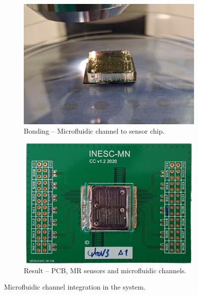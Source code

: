 \begin{figure}[!ht]
    \centering
    \begin{subfigure}[b]{.475\linewidth}
        \centering
        \includegraphics[width=\linewidth]{images/appendix_b/bonding.png}
        \caption{Bonding -- Microfluidic channel to sensor chip.}
        \label{figure:mf-bonding}
    \end{subfigure}
    \hfill
    \centering
    \begin{subfigure}[b]{.475\linewidth}
        \centering
        \includegraphics[width=\linewidth]{images/appendix_b/sensorpcb_b.png}
        \caption{Result -- PCB, MR sensors and microfluidic channels.}
        \label{figure:mf-result}
    \end{subfigure}

    \caption{Microfluidic channel integration in the system.}
    \label{figure:microfluidic}
\end{figure}

